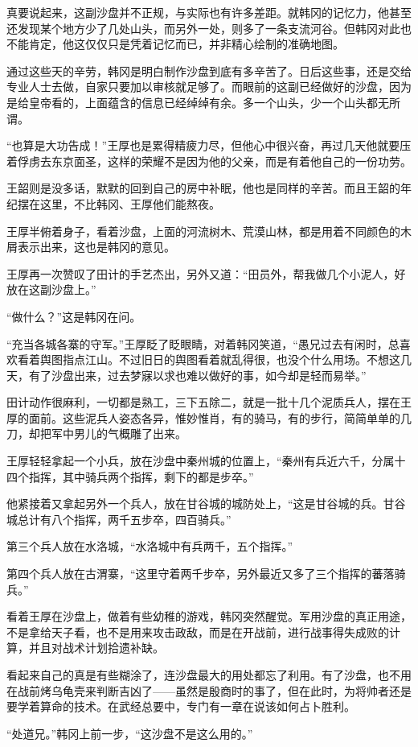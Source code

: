真要说起来，这副沙盘并不正规，与实际也有许多差距。就韩冈的记忆力，他甚至还发现某个地方少了几处山头，而另外一处，则多了一条支流河谷。但韩冈对此也不能肯定，他这仅仅只是凭着记忆而已，并非精心绘制的准确地图。

通过这些天的辛劳，韩冈是明白制作沙盘到底有多辛苦了。日后这些事，还是交给专业人士去做，自家只要加以审核就足够了。而眼前的这副已经做好的沙盘，因为是给皇帝看的，上面蕴含的信息已经绰绰有余。多一个山头，少一个山头都无所谓。

“也算是大功告成！”王厚也是累得精疲力尽，但他心中很兴奋，再过几天他就要压着俘虏去东京面圣，这样的荣耀不是因为他的父亲，而是有着他自己的一份功劳。

王韶则是没多话，默默的回到自己的房中补眠，他也是同样的辛苦。而且王韶的年纪摆在这里，不比韩冈、王厚他们能熬夜。

王厚半俯着身子，看着沙盘，上面的河流树木、荒漠山林，都是用着不同颜色的木屑表示出来，这也是韩冈的意见。

王厚再一次赞叹了田计的手艺杰出，另外又道：“田员外，帮我做几个小泥人，好放在这副沙盘上。”

“做什么？”这是韩冈在问。

“充当各城各寨的守军。”王厚眨了眨眼睛，对着韩冈笑道，“愚兄过去有闲时，总喜欢看着舆图指点江山。不过旧日的舆图看着就乱得很，也没个什么用场。不想这几天，有了沙盘出来，过去梦寐以求也难以做好的事，如今却是轻而易举。”

田计动作很麻利，一切都是熟工，三下五除二，就是一批十几个泥质兵人，摆在王厚的面前。这些泥兵人姿态各异，惟妙惟肖，有的骑马，有的步行，简简单单的几刀，却把军中男儿的气概雕了出来。

王厚轻轻拿起一个小兵，放在沙盘中秦州城的位置上，“秦州有兵近六千，分属十四个指挥，其中骑兵两个指挥，剩下的都是步卒。”

他紧接着又拿起另外一个兵人，放在甘谷城的城防处上，“这是甘谷城的兵。甘谷城总计有八个指挥，两千五步卒，四百骑兵。”

第三个兵人放在水洛城，“水洛城中有兵两千，五个指挥。”

第四个兵人放在古渭寨，“这里守着两千步卒，另外最近又多了三个指挥的蕃落骑兵。”

看着王厚在沙盘上，做着有些幼稚的游戏，韩冈突然醒觉。军用沙盘的真正用途，不是拿给天子看，也不是用来攻击政敌，而是在开战前，进行战事得失成败的计算，并且对战术计划拾遗补缺。

看起来自己的真是有些糊涂了，连沙盘最大的用处都忘了利用。有了沙盘，也不用在战前烤乌龟壳来判断吉凶了——虽然是殷商时的事了，但在此时，为将帅者还是要学着算命的技术。在武经总要中，专门有一章在说该如何占卜胜利。

“处道兄。”韩冈上前一步，“这沙盘不是这么用的。”

